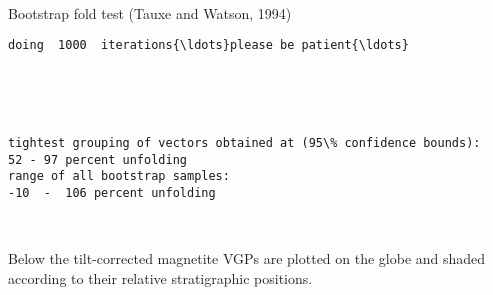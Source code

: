 \documentclass[11pt]{article}
\begin{document}
    \begin{center}
    \end{center}
    { \hspace*{\fill} \\}
    
    Bootstrap fold test (Tauxe and Watson, 1994)


    \begin{Verbatim}[commandchars=\\\{\}]
doing  1000  iterations{\ldots}please be patient{\ldots}
    \end{Verbatim}

    \begin{center}
    \end{center}
    { \hspace*{\fill} \\}
    
    \begin{center}
    \end{center}
    { \hspace*{\fill} \\}
    
    \begin{Verbatim}[commandchars=\\\{\}]
tightest grouping of vectors obtained at (95\% confidence bounds):
52 - 97 percent unfolding
range of all bootstrap samples: 
-10  -  106 percent unfolding
    \end{Verbatim}

    \begin{center}
    \end{center}
    { \hspace*{\fill} \\}
    
    Below the tilt-corrected magnetite VGPs are plotted on the globe and
shaded according to their relative stratigraphic positions.


    \begin{center}
    \end{center}
    { \hspace*{\fill} \\}
    
\end{document}
